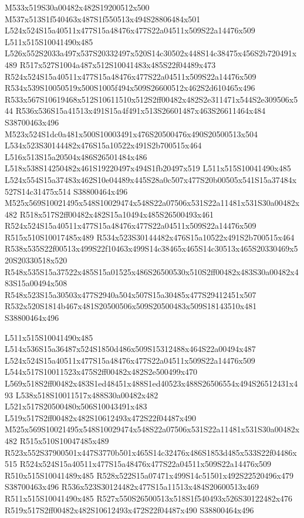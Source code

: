 \documentclass{article}
\begin{document}
\begin{multicols}{2}
M533x519S30a00482x482S19200512x500 M537x513S1f540463x487S1f550513x494S28806484x501 L524x524S15a40511x477S15a48476x477S22a04511x509S22a14476x509 L511x515S10041490x485 L526x552S2033a497x537S20332497x520S14c30502x448S14c38475x456S2b720491x489 R517x527S1004a487x512S10041483x485S22f04489x473 R524x524S15a40511x477S15a48476x477S22a04511x509S22a14476x509 R534x539S10050519x500S1005f494x509S26600512x462S2d610465x496 R533x567S10619468x512S10611510x512S2ff00482x482S2e311471x544S2e309506x544 R536x536S15a41513x491S15a4f491x513S26601487x463S26611464x484 S38700463x496 M523x524S1dc0a481x500S10003491x476S20500476x490S20500513x504 L534x523S30144482x476S15a10522x491S2b700515x464 L516x513S15a20504x486S26501484x486 L518x538S14250482x461S19220497x494S1fb20497x519 L511x515S10041490x485 L524x554S15a37483x462S10e04489x445S28a0c507x477S20b00505x541S15a37484x527S14c31475x514 S38800464x496 M525x569S10021495x548S10029474x548S22a07506x531S22a11481x531S30a00482x482 R518x517S2ff00482x482S15a10494x485S26500493x461 R524x524S15a40511x477S15a48476x477S22a04511x509S22a14476x509 R515x510S10017485x489 R534x523S30144482x476S15a10522x491S2b700515x464 R538x535S22f00513x499S22f10463x499S14c38465x465S14c30513x465S20330469x520S20330518x520 R548x535S15a37522x485S15a01525x486S26500530x510S2ff00482x483S30a00482x483S15a00494x508 R548x523S15a30503x477S2940a504x507S15a30485x477S29412451x507 R532x520S1814b467x481S20500506x509S20500483x509S18143510x481 S38800464x496

L511x515S10041490x485 L514x536S15a36487x524S1850d486x509S15312488x464S22a00494x487 L524x524S15a40511x477S15a48476x477S22a04511x509S22a14476x509 L544x517S10011523x475S2ff00482x482S2e500499x470 L569x518S2ff00482x483S1ed48451x488S1ed40523x488S26506554x494S26512431x493 L538x518S10011517x488S30a00482x482 L521x517S20500480x506S10043491x483 L519x517S2ff00482x482S10612493x472S22f04487x490 M525x569S10021495x548S10029474x548S22a07506x531S22a11481x531S30a00482x482 R515x510S10047485x489 R523x552S37900501x447S3770b501x465S14c32476x486S1853d485x533S22f04486x515 R524x524S15a40511x477S15a48476x477S22a04511x509S22a14476x509 R510x515S10041489x485 R528x522S15a07471x499S14c51501x492S22520496x479 S38700463x496 R536x523S30124482x477S15a11513x484S20600513x469 R511x515S10041490x485 R527x550S26500513x518S1f540493x526S30122482x476 R519x517S2ff00482x482S10612493x472S22f04487x490 S38800464x496


\end{multicols}
\end{document}
